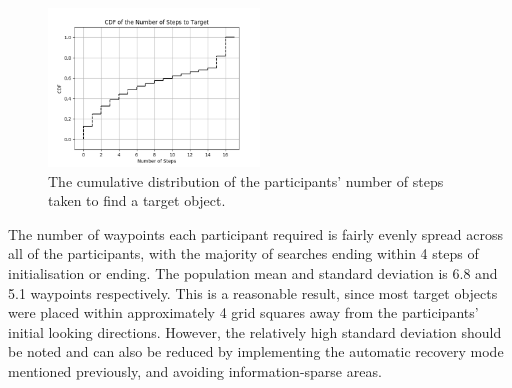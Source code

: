 \documentclass[a4paper, twoside]{article}
\begin{document}
\begin{figure}
  \centering
  \includegraphics[width=0.5\textwidth]{figures/cdf_total_steps.png}
  \caption{The cumulative distribution of the participants' number of steps taken to find a target object. }\label{fig:nsteps-participants}
\end{figure}

The number of waypoints each participant required is fairly evenly spread across all of the participants, with the majority of searches ending within 4 steps of initialisation or ending. The population mean and standard deviation is 6.8 and 5.1 waypoints respectively. This is a reasonable result, since most target objects were placed within approximately 4 grid squares away from the participants' initial looking directions. However, the relatively high standard deviation should be noted and can also be reduced by implementing the automatic recovery mode mentioned previously, and avoiding information-sparse areas.



\end{document}
